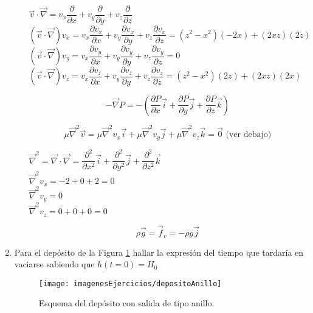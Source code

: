 \begin{enumerate}
\begin{enumerate}
		$\vec{v} \cdot \vec{\nabla} = 
			v_x \dfrac{\partial}{\partial x} + 
			v_y \dfrac{\partial}{\partial y} + 
			v_z \dfrac{\partial}{\partial z}
		$\\
		
		$(\vec{v} \cdot \vec{\nabla})v_x = 
			v_x \dfrac{\partial v_x}{\partial x} + 
			v_y \dfrac{\partial v_x}{\partial y} + 
			v_z \dfrac{\partial v_x}{\partial z} =
			(z^2 - x^2)(-2x) + (2xz)(2z)
		$\\
		
		$(\vec{v} \cdot \vec{\nabla})v_y = 
			v_x \dfrac{\partial v_y}{\partial x} + 
			v_y \dfrac{\partial v_y}{\partial y} + 
			v_z \dfrac{\partial v_y}{\partial z} =
			0
		$\\
		
		$(\vec{v} \cdot \vec{\nabla})v_z = 
			v_x \dfrac{\partial v_z}{\partial x} + 
			v_y \dfrac{\partial v_z}{\partial y} + 
			v_z \dfrac{\partial v_z}{\partial z} =
			(z^2 - x^2)(2z) + (2xz)(2x)
		$
		
		\[-\vec{\nabla} P = -\left(
			\dfrac{\partial P}{\partial x} \vec{i} +
			\dfrac{\partial P}{\partial y} \vec{j} +
			\dfrac{\partial P}{\partial z} \vec{k}
			\right)
		\]	
		
		\[
			\mu \vec{\nabla}^2 \vec{v} =
				\mu \vec{\nabla}^2 v_x \vec{i} + 
				\mu \vec{\nabla}^2 v_y \vec{j} + 
				\mu \vec{\nabla}^2 v_z \vec{k} =
				\vec{0} \text{ (ver debajo)}
		\]
		
		$\vec{\nabla}^2 = \vec{\nabla} \cdot \vec{\nabla} = 
			\dfrac{\partial^2}{\partial x^2} \vec{i} +
			\dfrac{\partial^2}{\partial y^2} \vec{j} +
			\dfrac{\partial^2}{\partial z^2} \vec{k}
		$\\
		
		$\vec{\nabla}^2 v_x = -2 + 0 + 2 = 0$\\
		$\vec{\nabla}^2 v_y = 0$\\
		$\vec{\nabla}^2 v_z = 0 + 0 + 0 = 0$
		
		\[\rho \vec{g} = \vec{f}_v = -\rho g \vec{j}\]
		
\end{enumerate}


\black
\item Para el depósito de la Figura \ref{fig:depositoAnillo} hallar la expresión del tiempo que tardaría en vaciarse sabiendo que $h(t = 0) = H_0$

\begin{figure}[H]
	\centering
	\texttt{[image: imagenesEjercicios/depositoAnillo]}
	\caption{Esquema del depósito con salida de tipo anillo.}
	\label{fig:depositoAnillo}
\end{figure}


\end{enumerate}
